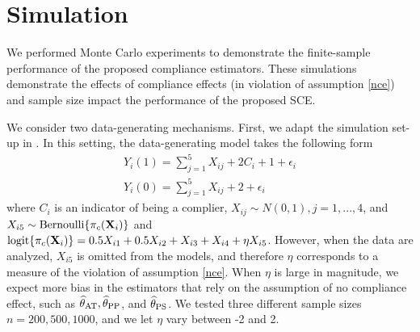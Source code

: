 \documentclass{article}
\def\spp{_{\text{PP}}}
\def\sat{_{\text{AT}}}
\def\sps{_{\text{PS}}}
\begin{document}




\section{Simulation}

We performed Monte Carlo experiments to demonstrate the finite-sample performance of the proposed compliance estimators. These simulations demonstrate the effects of compliance effects (in violation of assumption \ref{nce}) and sample size impact the performance of the proposed SCE. 

We consider two data-generating mechanisms. First, we adapt the simulation set-up in \cite{Ding2017}. In this setting, the data-generating model takes the following form
\begin{align}
    Y_i(1) = \sum_{j=1}^5 X_{ij} + 2C_i + 1 + \epsilon_i\\
    Y_i(0) = \sum_{j=1}^5 X_{ij} + 2 + \epsilon_i
\end{align}
where $C_i$ is an indicator of being a complier, $X_{ij} \sim N(0,1), j = 1, ..., 4$, and $X_{i5} \sim \text{Bernoulli}\{\pi_c({\bf X}_i)\}$ and $\mbox{logit}\{\pi_c({\bf X}_i)\} = 0.5X_{i1} + 0.5X_{i2} + X_{i3} + X_{i4} + \eta X_{i5}$. 
However, when the data are analyzed, $X_{i5}$ is omitted from the models, and therefore $\eta$ corresponds to a measure of the violation of assumption \ref{nce}. When $\eta$ is large in magnitude, we expect more bias in the estimators that rely on the assumption of no compliance effect, such as $\thetahat\sat, \thetahat\spp$, and $\thetahat\sps$. We tested three different sample sizes $n = 200, 500, 1000$, and we let $\eta$ vary between -2 and 2.
\end{document}
